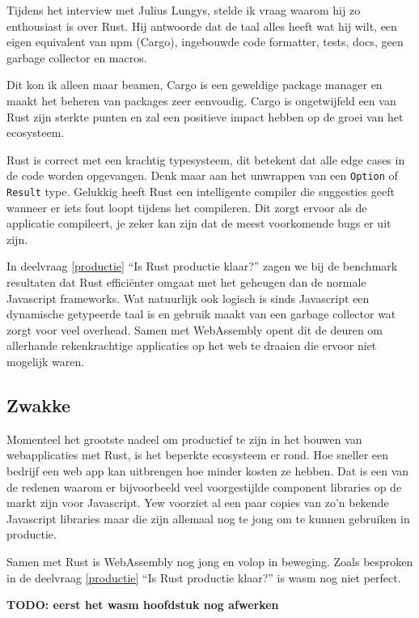 Tijdens het interview met Julius Lungys, stelde ik vraag waarom hij zo enthousiast is over Rust. 
Hij antwoorde dat de taal alles heeft wat hij wilt, een eigen equivalent van npm (Cargo), ingebouwde
code formatter, tests, docs, geen garbage collector en macros.

Dit kon ik alleen maar beamen, Cargo is een geweldige package manager en maakt het beheren van
packages zeer eenvoudig. Cargo is ongetwijfeld een van Rust zijn sterkte punten en zal een positieve
impact hebben op de groei van het ecosysteem.

Rust is correct met een krachtig typesysteem, dit betekent dat alle edge cases in de code worden
opgevangen. Denk maar aan het unwrappen van een \texttt{Option} of
\texttt{Result} type. Gelukkig heeft Rust een intelligente compiler die suggesties geeft
wanneer er iets fout loopt tijdens het compileren. Dit zorgt ervoor als de applicatie compileert, je
zeker kan zijn dat de meest voorkomende bugs er uit zijn.

In deelvraag \ref{productie} \enquote{Is Rust productie klaar?} zagen we bij de benchmark resultaten dat
Rust efficiënter omgaat met het geheugen dan de normale Javascript frameworks. Wat natuurlijk ook
logisch is sinds Javascript een dynamische getypeerde taal is en gebruik maakt van een garbage
collector wat zorgt voor veel overhead. Samen met WebAssembly opent dit de deuren om allerhande
rekenkrachtige applicaties op het web te draaien die ervoor niet mogelijk waren.

\subsection{Zwakke}

Momenteel het grootste nadeel om productief te zijn in het bouwen van webapplicaties met Rust, is
het beperkte ecosysteem er rond. Hoe sneller een bedrijf een web app kan uitbrengen hoe minder
kosten ze hebben. Dat is een van de redenen waarom er bijvoorbeeld veel voorgestijlde component
libraries op de markt zijn voor Javascript. Yew voorziet al een paar copies van zo'n bekende
Javascript libraries maar die zijn allemaal nog te jong om te kunnen gebruiken in productie.

Samen met Rust is WebAssembly nog jong en volop in beweging. Zoals besproken in de deelvraag
\ref{productie} \enquote{Is Rust productie klaar?} is wasm nog niet perfect.

\textbf{TODO: eerst het wasm hoofdstuk nog afwerken}

